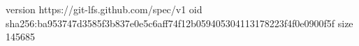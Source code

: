 version https://git-lfs.github.com/spec/v1
oid sha256:ba953747d3585f3b837e0e5c6aff74f12b059405304113178223f4f0e0900f5f
size 145685
